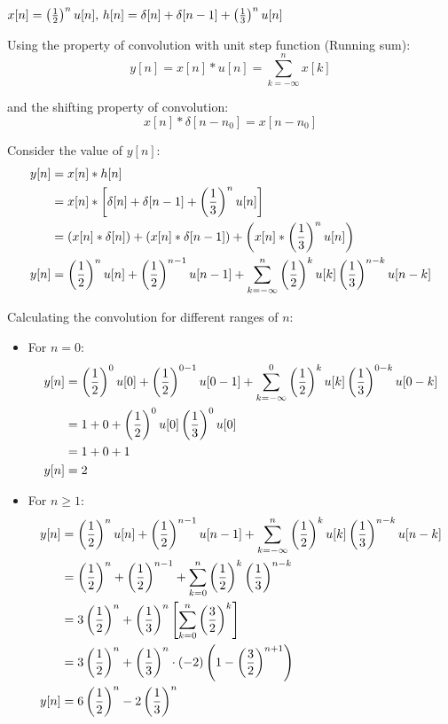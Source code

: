 \documentclass[a4paper, 10pt]{article}
\begin{document}
\newpage

\begin{tosubmit}    
\begin{subproblems}[start=3]
    \item \( x[n] = \left( \frac{1}{2} \right)^n u[n],\, h[n] = \delta[n] +\delta[n-1] +  \left( \frac{1}{3} \right)^n u[n] \)
\end{subproblems}

\par\noindent\submitsolution
Using the property of convolution with unit step function (Running sum):
\[ y[n] = x[n] * u[n] = \sum_{k=-\infty}^{n} x[k] \]

and the shifting property of convolution:
\[ x[n] * \delta[n - n_0] = x[n - n_0] \]

Consider the value of \( y[n] \):
\begin{align*}
    y[n] &= x[n] * h[n] \\
    &= x[n] * \left[ \delta[n] + \delta[n - 1] + \left( \frac{1}{3} \right)^n u[n] \right] \\
    &= \left( x[n] * \delta[n] \right) + \left( x[n] * \delta[n - 1] \right) + \left( x[n] * \left( \frac{1}{3} \right)^n u[n] \right) \\
    y[n] &= \left( \frac{1}{2} \right)^n u[n] + \left( \frac{1}{2} \right)^{n - 1} u[n - 1] + \sum_{k=-\infty}^{n} \left( \frac{1}{2} \right)^k u[k] \left( \frac{1}{3} \right)^{n - k} u[n - k]
\end{align*}

Calculating the convolution for different ranges of \( n \):
\begin{itemize}
    \item For \( n = 0 \):
    \begin{align*}
        y[n] &= \left( \frac{1}{2} \right)^0 u[0] + \left( \frac{1}{2} \right)^{0 - 1} u[0 - 1] + \sum_{k=-\infty}^{0} \left( \frac{1}{2} \right)^k u[k] \left( \frac{1}{3} \right)^{0 - k} u[0 - k] \\
        &= 1 + 0 + \left( \frac{1}{2} \right)^0 u[0] \left( \frac{1}{3} \right)^{0} u[0] \\
        &= 1 + 0 + 1 \\
        y[n] &= 2
    \end{align*}

    \item For \( n \geq 1 \):
    \begin{align*}
        y[n] &= \left( \frac{1}{2} \right)^n u[n] + \left( \frac{1}{2} \right)^{n - 1} u[n - 1] + \sum_{k=-\infty}^{n} \left( \frac{1}{2} \right)^k u[k] \left( \frac{1}{3} \right)^{n - k} u[n - k] \\
        &= \left( \frac{1}{2} \right)^n + \left( \frac{1}{2} \right)^{n - 1} + \sum_{k=0}^{n} \left( \frac{1}{2} \right)^k \left( \frac{1}{3} \right)^{n - k} \\
        &= 3 \left( \frac{1}{2} \right)^n + \left( \frac{1}{3} \right)^{n} \left[ \sum_{k=0}^{n} \left( \frac{3}{2} \right)^k \right] \\
        &= 3 \left( \frac{1}{2} \right)^n + \left( \frac{1}{3} \right)^{n} \cdot (-2)\left(1 - \left( \frac{3}{2} \right)^{n+1}\right) \\
        y[n] &= 6 \left( \frac{1}{2} \right)^n - 2 \left( \frac{1}{3} \right)^{n}
    \end{align*}
\end{itemize}


\end{tosubmit}
\end{document}
